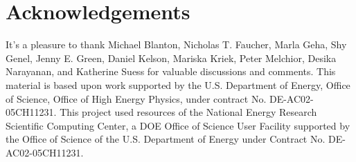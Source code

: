 \documentclass[12pt, letterpaper, preprint, comicneue]{aastex63}
\newcommand{\gr}{g{-}r}
\newcommand{\fnuv}{FUV{-}NUV}
\newcommand{\eda}{EDA}
\newcommand{\todo}[1]{\marginpar{\color{red}TODO}{\color{red}#1}}
\newcommand{\ch}[1]{#1}%
\begin{document}
\begin{abstract}
\end{abstract}



 





\section*{Acknowledgements}
It's a pleasure to thank 
    Michael Blanton, 
    Nicholas T. Faucher, 
    Marla Geha, 
    Shy Genel,
    Jenny E. Green,
    Daniel Kelson, 
    Mariska Kriek, 
    Peter Melchior, 
    Desika Narayanan, 
    and Katherine Suess for
valuable discussions and comments.
This material is based upon work supported by the U.S. Department of Energy,
Office of Science, Office of High Energy Physics, under contract No.
DE-AC02-05CH11231.  This project used resources of the National Energy Research
Scientific Computing Center, a DOE Office of Science User Facility supported by
the Office of Science of the U.S.  Department of Energy under Contract No.
DE-AC02-05CH11231. 
\end{document}
